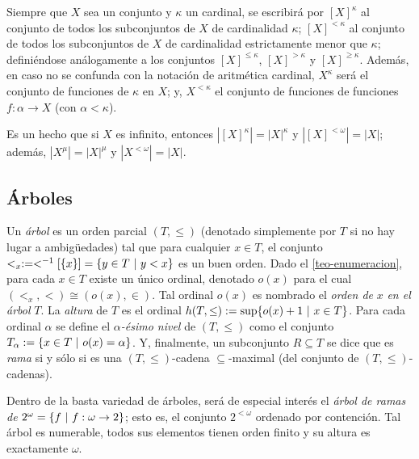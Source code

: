 \index[sym]{$[X]^\kappa$}\index[sym]{$[X]^{<\kappa}$}\index[sym]{$[X]^{\leq \kappa}$}\index[sym]{$[X]^{> \kappa}$}\index[sym]{$[X]^{\geq \kappa}$}
Siempre que $X$ sea un conjunto y $\kappa$ un cardinal, se escribirá por $[X]^\kappa$ al conjunto de todos los subconjuntos de $X$ de cardinalidad $\kappa$; $[X]^{<\kappa}$ al conjunto de todos los subconjuntos de $X$ de cardinalidad estrictamente menor que $\kappa$; definiéndose análogamente a los conjuntos $[X]^{\leq \kappa}$, $[X]^{>\kappa}$ y $[X]^{\geq \kappa}$. Además, en caso no se confunda con la notación de aritmética cardinal, $X^\kappa$ será el conjunto de funciones de $\kappa$ en $X$; y, $X^{<\kappa}$ el conjunto de funciones de funciones $f:\alpha \to X$ (con $\alpha < \kappa$).

Es un hecho que si $X$ es infinito, entonces $|[X]^\kappa|=|X|^\kappa$ y $|[X]^{<\omega}|=|X|$; además, $|X^\mu|=|X|^\mu$ y $|X^{<\omega}|=|X|$.

\subsection{Árboles}

Un \textit{árbol} es un orden parcial $(T,\leq)$ (denotado simplemente por $T$ si no hay lugar a ambigüedades) tal que para cualquier $x \in T$, el conjunto $<_x:=<^{-1}[\{x\}]=\{y \in T \text{ $|$ } y < x\}$ es un buen orden. Dado el \autoref{teo-enumeracion}, para cada $x \in T$ existe un único ordinal, denotado $o(x)$ para el cual $(<_x,<) \cong (o(x),\in)$. Tal ordinal $o(x)$ es nombrado el \textit{orden de} $x$ \textit{en el árbol} $T$. La \textit{altura} de $T$ es el ordinal $h(T,\leq):=\sup\{o(x) +1 \text{ $|$ } x \in T\}$. Para cada ordinal $\alpha$ se define el $\alpha$\textit{-ésimo nivel} de $(T,\leq)$ como el conjunto $T_\alpha := \{ x \in T \text{ $|$ } o(x) = \alpha \}$. Y, finalmente, un subconjunto $R \subseteq T$ se dice que es \textit{rama} si y sólo si es una $(T,\leq)$-cadena $\subseteq$-maximal (del conjunto de $(T,\leq)$-cadenas).

Dentro de la basta variedad de árboles, será de especial interés el \textit{árbol de ramas de} $2^\omega=\{f \text{ $|$ } f:\omega \to 2\}$; esto es, el conjunto $2^{<\omega}$ ordenado por contención. Tal árbol es numerable, todos sus elementos tienen orden finito y su altura es exactamente $\omega$.

